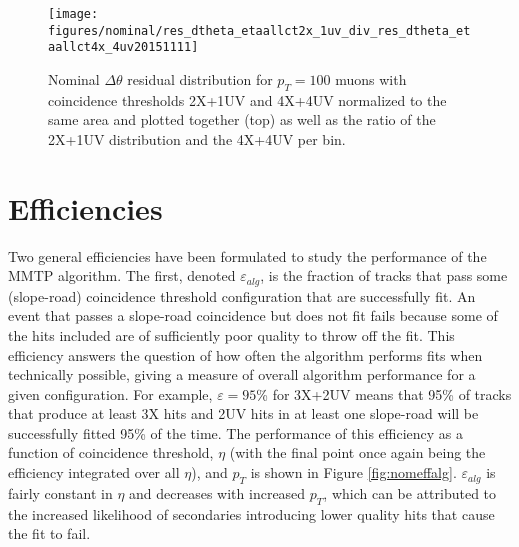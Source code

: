 \begin{figure}[!htbp]\captionsetup{justification=centering}
  \begin{center}
  \texttt{[image: figures/nominal/res\_dtheta\_etaallct2x\_1uv\_div\_res\_dtheta\_etaallct4x\_4uv20151111]}
  \caption{\label{fig:nomperf2x1uv}Nominal $\Delta\theta$ residual distribution for $p_T=100$ \GeV muons with coincidence thresholds 2X+1UV and 4X+4UV normalized to the same area and plotted together (top) as well as the ratio of the 2X+1UV distribution and the 4X+4UV per bin.}
  \end{center}
\end{figure}
\clearpage
\section{Efficiencies}
Two general efficiencies have been formulated to study the performance of the MMTP algorithm.  The first, denoted $\varepsilon_{alg}$, is the fraction of tracks that pass some (slope-road) coincidence threshold configuration that are successfully fit.  An event that passes a slope-road coincidence but does not fit fails because some of the hits included are of sufficiently poor quality to throw off the fit.  This efficiency answers the question of how often the algorithm performs fits when technically possible, giving a measure of overall algorithm performance for a given configuration.  For example, $\varepsilon=95$\% for 3X+2UV means that 95\% of tracks that produce at least 3X hits and 2UV hits in at least one slope-road will be successfully fitted 95\% of the time.  The performance of this efficiency as a function of coincidence threshold, $\eta$ (with the final point once again being the efficiency integrated over all $\eta$), and $p_T$ is shown in Figure \ref{fig:nomeffalg}.  $\varepsilon_{alg}$ is fairly constant in $\eta$ and decreases with increased $p_T$, which can be attributed to the increased likelihood of secondaries introducing lower quality hits that cause the fit to fail.

